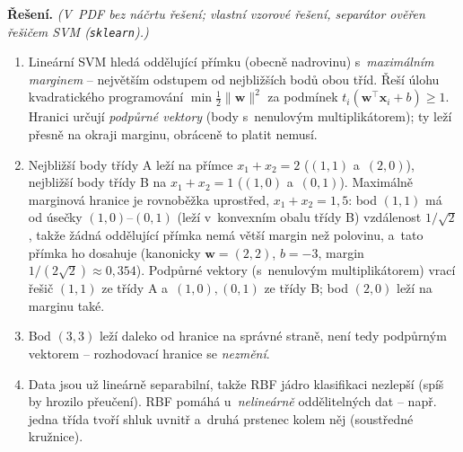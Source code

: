\medskip
\noindent\textbf{Řešení.} \textit{(V~PDF bez náčrtu řešení; vlastní vzorové řešení, separátor ověřen řešičem SVM (\texttt{sklearn}).)}\par
\begin{enumerate}[nosep]
  \item Lineární SVM hledá oddělující přímku (obecně nadrovinu) s~\emph{maximálním marginem} -- největším odstupem od nejbližších bodů obou tříd. Řeší úlohu kvadratického programování $\min\tfrac12\|\mathbf{w}\|^2$ za podmínek $t_i(\mathbf{w}^\top \mathbf{x}_i+b)\ge 1$. Hranici určují \emph{podpůrné vektory} (body s~nenulovým multiplikátorem); ty leží přesně na okraji marginu, obráceně to platit nemusí.
  \item Nejbližší body třídy A leží na přímce $x_1+x_2=2$ ($(1,1)$ a~$(2,0)$), nejbližší body třídy B na $x_1+x_2=1$ ($(1,0)$ a~$(0,1)$). Maximálně marginová hranice je rovnoběžka uprostřed, $x_1+x_2=1{,}5$: bod $(1,1)$ má od úsečky $(1,0)$--$(0,1)$ (leží v~konvexním obalu třídy B) vzdálenost $1/\sqrt2$, takže žádná oddělující přímka nemá větší margin než polovinu, a~tato přímka ho dosahuje (kanonicky $\mathbf{w}=(2,2)$, $b=-3$, margin $1/(2\sqrt2)\approx0{,}354$). Podpůrné vektory (s~nenulovým multiplikátorem) vrací řešič $(1,1)$ ze třídy A a~$(1,0),(0,1)$ ze třídy B; bod $(2,0)$ leží na marginu také.
  \item Bod $(3,3)$ leží daleko od hranice na správné straně, není tedy podpůrným vektorem -- rozhodovací hranice se \emph{nezmění}.
  \item Data jsou už lineárně separabilní, takže RBF jádro klasifikaci nezlepší (spíš by hrozilo přeučení). RBF pomáhá u~\emph{nelineárně} oddělitelných dat -- např. jedna třída tvoří shluk uvnitř a~druhá prstenec kolem něj (soustředné kružnice).
\end{enumerate}

